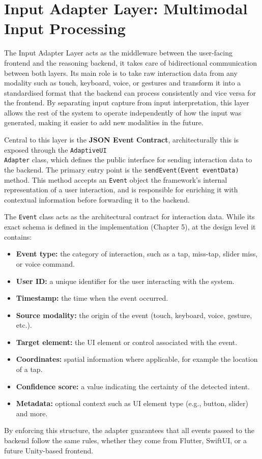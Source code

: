 \documentclass[openany]{book}
\begin{document}
\section{Input Adapter Layer: Multimodal Input Processing}
The Input Adapter Layer acts as the middleware between the user-facing frontend and the reasoning backend, it takes care of bidirectional communication between both layers. Its main role is to take raw interaction data from any modality such as touch, keyboard, voice, or gestures and transform it into a standardised format that the backend can process consistently and vice versa for the frontend. By separating input capture from input interpretation, this layer allows the rest of the system to operate independently of how the input was generated, making it easier to add new modalities in the future.

Central to this layer is the \textbf{JSON Event Contract}, architecturally this is exposed through the \texttt{AdaptiveUI\\Adapter} class, which defines the public interface for sending interaction data to the backend. The primary entry point is the \texttt{sendEvent(Event eventData)} method. This method accepts an \texttt{Event} object the framework’s internal representation of a user interaction, and is responsible for enriching it with contextual information before forwarding it to the backend.

The \texttt{Event} class acts as the architectural contract for interaction data. While its exact schema is defined in the implementation (Chapter 5), at the design level it contains:
\begin{itemize}
    \item \textbf{Event type:}  the category of interaction, such as a tap, miss-tap, slider miss, or voice command.
    \item \textbf{User ID:} a unique identifier for the user interacting with the system.
    \item \textbf{Timestamp:} the time when the event occurred.
    \item \textbf{Source modality:} the origin of the event (touch, keyboard, voice, gesture, etc.).
    \item \textbf{Target element:} the UI element or control associated with the event.
    \item \textbf{Coordinates:} spatial information where applicable, for example the location of a tap.
    \item \textbf{Confidence score:} a value indicating the certainty of the detected intent.
    \item \textbf{Metadata:} optional context such as UI element type (e.g., button, slider) and more.
\end{itemize}
By enforcing this structure, the adapter guarantees that all events passed to the backend follow the same rules, whether they come from Flutter, SwiftUI, or a future Unity-based frontend.
\end{document}
